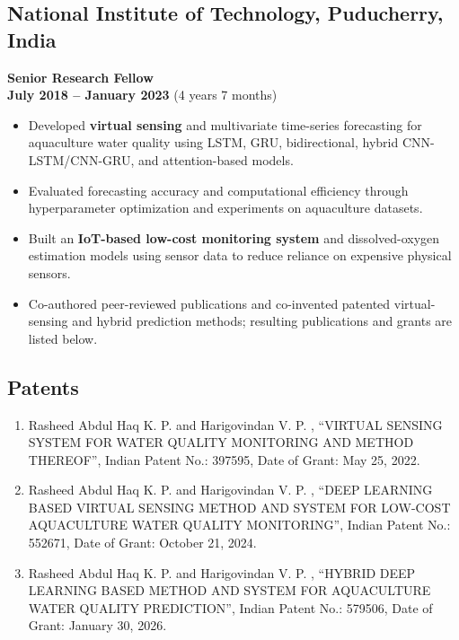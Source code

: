 \documentclass[a4paper,10pt]{article}
\begin{document}
\subsection{National Institute of Technology, Puducherry, India}
\textbf{Senior Research Fellow} \\
\hfill \textbf{July 2018 -- January 2023} (4 years 7 months)
\begin{itemize}
\item Developed \textbf{virtual sensing} and multivariate time-series forecasting for aquaculture water quality using LSTM, GRU, bidirectional, hybrid CNN-LSTM/CNN-GRU, and attention-based models.

\item Evaluated forecasting accuracy and computational efficiency through hyperparameter optimization and experiments on aquaculture datasets.

\item Built an \textbf{IoT-based low-cost monitoring system} and dissolved-oxygen estimation models using sensor data to reduce reliance on expensive physical sensors.

\item Co-authored peer-reviewed publications and co-invented patented virtual-sensing and hybrid prediction methods; resulting publications and grants are listed below.
\end{itemize}
	
\subsection{Patents}
\begin{enumerate}
	\item {Rasheed Abdul Haq K. P. and Harigovindan V. P. }, \enquote{VIRTUAL SENSING SYSTEM FOR WATER QUALITY MONITORING AND METHOD THEREOF}, Indian Patent No.: 397595, Date of Grant: May 25, 2022.
	\item {Rasheed Abdul Haq K. P. and Harigovindan V. P. }, \enquote{DEEP LEARNING BASED VIRTUAL SENSING METHOD AND SYSTEM FOR LOW-COST AQUACULTURE WATER QUALITY MONITORING}, Indian Patent No.: 552671, Date of Grant: October 21, 2024.	
	\item {Rasheed Abdul Haq K. P. and Harigovindan V. P. }, \enquote{HYBRID DEEP LEARNING BASED METHOD AND SYSTEM FOR AQUACULTURE WATER QUALITY PREDICTION}, Indian Patent No.: 579506, Date of Grant: January 30, 2026.	
	
\end{enumerate}
\end{document}
